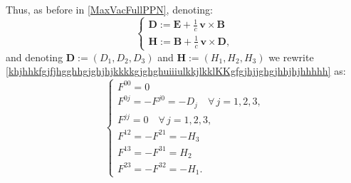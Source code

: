 \documentclass{article}
\theoremstyle{definition}
\theoremstyle{remark}
\renewcommand{\vec}[1]{\mathbf{#1}}
\newcommand{\er}{\eqref}
\newcommand{\er}{\eqref}
\begin{document}
Thus, as before in \er{MaxVacFullPPN}, denoting:
\begin{equation}\label{MaxVacFullPPNhjjgh}
\begin{cases}
\vec D:=\vec E+\frac{1}{c}\,\vec v\times
\vec B\\
\vec H:=\vec B+\frac{1}{c}\,\vec v\times \vec D,
\end{cases}
\end{equation}
and denoting $\vec D:=(D_1,D_2,D_3)$ and $\vec H:=(H_1,H_2,H_3)$ we
rewrite
\er{khjhhkfgjfjhgghhgjghjhjkkkkgjghghuiiiulkkjlkklKKgfgjhjjghgjhhjhjhhhhh}
as:
\begin{equation}\label{khjhhkfgjfjhgghhgjghjhjkkkkgjghghuiiiulkkjlkklKKgfgjhjjghgjhhjhjhhhhhghhg}
\begin{cases}
F^{00}=0
\\
F^{0j}=-F^{j0}=-D_j\quad\forall\, j=1,2,3,\\
F^{jj}=0 \quad\forall\, j=1,2,3,\\
F^{12}=-F^{21}=-H_3\\
F^{13}=-F^{31}=H_2\\
F^{23}=-F^{32}=-H_1.
\end{cases}
\end{equation}
\end{document}
